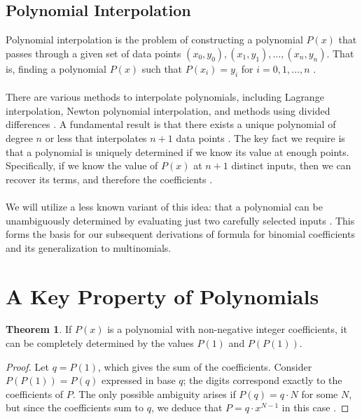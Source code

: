 \documentclass{article}
\theoremstyle{plain}
\theoremstyle{definition}
\newtheorem{thm}{Theorem}
\begin{document}
\subsection{Polynomial Interpolation}
Polynomial interpolation is the problem of constructing a polynomial $P(x)$ that passes through a given set of data points ${(x_0, y_0), (x_1, y_1), \ldots, (x_n, y_n)}$. That is, finding a polynomial $P(x)$ such that $P(x_i) = y_i$ for $i = 0, 1, \ldots, n$ \cite{burden2011numerical, kincaid2012numerical}.
\\
\\
There are various methods to interpolate polynomials, including Lagrange interpolation, Newton polynomial interpolation, and methods using divided differences \cite{burden2011numerical, kincaid2012numerical}. A fundamental result is that there exists a unique polynomial of degree \( n \) or less that interpolates \( n+1 \) data points \cite{burden2011numerical}. The key fact we require is that a polynomial is uniquely determined if we know its value at enough points. Specifically, if we know the value of \( P(x) \) at \( n+1 \) distinct inputs, then we can recover its terms, and therefore the coefficients \cite{cheney2013course}.
\\
\\
We will utilize a less known variant of this idea: that a polynomial can be unambiguously determined by evaluating just two carefully selected inputs \cite{arupinski,jcook}. This forms the basis for our subsequent derivations of formula for binomial coefficients and its generalization to multinomials.

\section{A Key Property of Polynomials}

\begin{thm}
\label{thm:1}
If $P(x)$ is a polynomial with non-negative integer coefficients, it can be completely determined by the values $P(1)$ and $P(P(1))$.
\end{thm}

\begin{proof}
Let $q = P(1)$, which gives the sum of the coefficients. Consider $P(P(1)) = P(q)$ expressed in base $q$; the digits correspond exactly to the coefficients of $P$. The only possible ambiguity arises if $P(q) = q\cdot N$ for some $N$, but since the coefficients sum to $q$, we deduce that $P = q \cdot x^{N-1}$ in this case \cite{arupinski}.
\end{proof}
\end{document}
